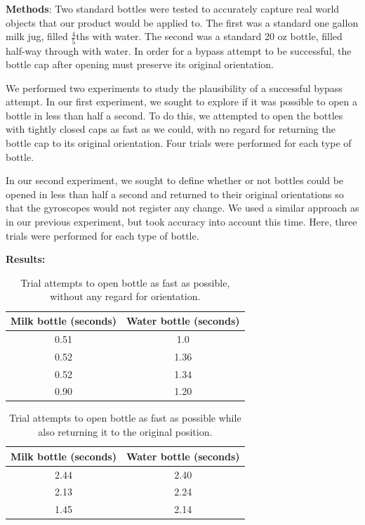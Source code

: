 \documentclass[12pt]{article}
\begin{document}
		\textbf{Methods}: Two standard bottles were tested to accurately capture real world objects that our product would be applied to. The first was a standard one gallon milk jug, filled $\frac{4}{5}$ths with water. The second was a standard 20 oz bottle, filled half-way through with water. In order for a bypass attempt to be successful, the bottle cap after opening must preserve its original orientation. 
		
		We performed two experiments to study the plausibility of a successful bypass attempt. In our first experiment, we sought to explore if it was possible to open a bottle in less than half a second. To do this, we attempted to open the bottles with tightly closed caps as fast as we could, with no regard for returning the bottle cap to its original orientation. Four trials were performed for each type of bottle. 
		
		In our second experiment, we sought to define whether or not bottles could be opened in less than half a second and returned to their original orientations so that the gyroscopes would not register any change. We used a similar approach as in our previous experiment, but took accuracy into account this time. Here, three trials were performed for each type of bottle. 
		
		\textbf{Results: }
		\begin{table}[H]
			\centering
			\begin{tabular}{|c|c|}
				\hline
				\textbf{Milk bottle (seconds)} & \textbf{Water bottle (seconds) } \\ \hline
				0.51 &1.0 \\ \hline
				0.52 & 1.36\\ \hline
				0.52&1.34\\ \hline
				0.90&1.20\\ \hline
			\end{tabular}
			\label{table:trial1}
			\caption{Trial attempts to open bottle as fast as possible, without any regard for orientation.}

		\end{table}
				\begin{table}[H]
			\centering
			\begin{tabular}{|c|c|}
				\hline
				\textbf{Milk bottle (seconds)} & \textbf{Water bottle (seconds) } \\ \hline
				2.44&
				2.40\\ \hline
				2.13&
				2.24\\ \hline
				1.45&
				2.14\\ \hline
			\end{tabular}
		\label{table:trial2}
			\caption{Trial attempts to open bottle as fast as possible while also returning it to the original position.}
		\end{table}
\end{document}
